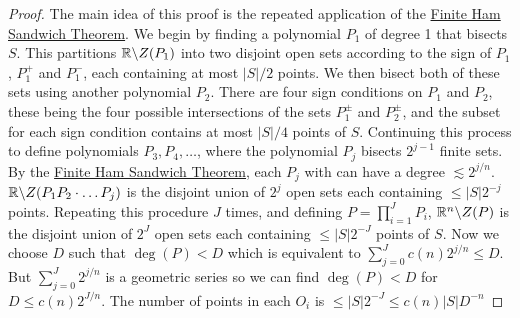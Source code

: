 \begin{proof}
The main idea of this proof is the repeated application of the \hyperref[thm:FiniteHamSandwich]{Finite Ham Sandwich Theorem}. We begin by finding a polynomial $P_1$ of degree 1 that bisects $S$. This partitions $\mathbb R \backslash Z(P_1)$
into two disjoint open sets according to the sign of $P_1$, $P_1^+$ and $P_1^-$, each containing at most $|S|/2$ points.
We then bisect both of these sets using another polynomial $P_2$.
There are four sign conditions on $P_1$ and $P_2$, these being the four possible intersections of the sets $P_1^{\pm}$ and $P_2^{\pm}$,
and the subset for each sign condition contains at most $|S|/4$ points of $S$. 
Continuing this process to define polynomials $P_3, P_4, \dots$, where the polynomial $P_j$ bisects $2^{j-1}$ finite sets. 
By the \hyperref[thm:FiniteHamSandwich]{Finite Ham Sandwich Theorem}, each $P_j$ with can have a degree
$\lesssim 2^{j/n}$. $\mathbb R \backslash Z (P_1 P_2 \cdot \dots P_j)$ is the disjoint union of $2^j$ open sets each containing $\leq |S| 2^{-j}$ points. 
Repeating this procedure $J$ times, and defining $P = \prod_{i=1}^{J} P_i$, $\mathbb R^n \backslash Z(P)$ is the disjoint union of $2^J$ open sets each containing $ \leq |S|2^{-J}$
points of $S$. Now we choose $D$ such that $\deg(P) < D$ which is equivalent to $\sum_{j=0}^J c(n) 2^{j/n} \leq D$. But $\sum_{j=0}^J 2^{j/n}$ is a geometric series so we can find $\deg (P) < D$ for $D \leq c(n) 2^{J/n}$. 
The number of points in each $O_i$ is $\leq |S| 2^{-J} \leq c(n) |S| D^{-n}$
\end{proof}

